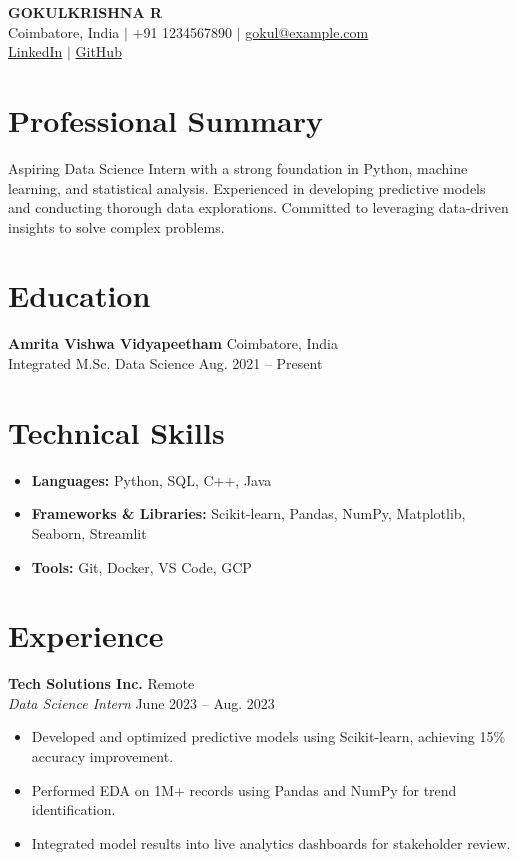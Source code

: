\documentclass[letterpaper,10pt]{article}
\begin{document}
\begin{center}
    {\Huge \textbf{GOKULKRISHNA R}} \\ \vspace{5pt}
    Coimbatore, India $|$ +91 1234567890 $|$ \href{mailto:gokul@example.com}{gokul@example.com} \\
    \href{https://linkedin.com/in/gokul}{LinkedIn} $|$ \href{https://github.com/gokul}{GitHub}
\end{center}

\section{Professional Summary}
Aspiring Data Science Intern with a strong foundation in Python, machine learning, and statistical analysis. Experienced in developing predictive models and conducting thorough data explorations. Committed to leveraging data-driven insights to solve complex problems.

\section{Education}
\textbf{Amrita Vishwa Vidyapeetham} \hfill Coimbatore, India \\
Integrated M.Sc. Data Science \hfill Aug. 2021 -- Present

\section{Technical Skills}
\begin{itemize}[leftmargin=*, noitemsep]
    \item \textbf{Languages:} Python, SQL, C++, Java
    \item \textbf{Frameworks \& Libraries:} Scikit-learn, Pandas, NumPy, Matplotlib, Seaborn, Streamlit
    \item \textbf{Tools:} Git, Docker, VS Code, GCP
\end{itemize}

\section{Experience}
\textbf{Tech Solutions Inc.} \hfill Remote \\
\textit{Data Science Intern} \hfill June 2023 -- Aug. 2023
\begin{itemize}[noitemsep]
    \item Developed and optimized predictive models using Scikit-learn, achieving 15\% accuracy improvement.
    \item Performed EDA on 1M+ records using Pandas and NumPy for trend identification.
    \item Integrated model results into live analytics dashboards for stakeholder review.
\end{itemize}
\end{document}
